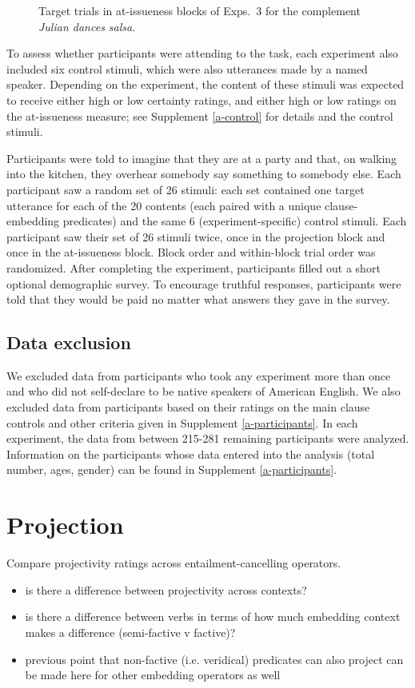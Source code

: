 \documentclass[11pt,fleqn]{article}
\newcommand{\6}{\mbox{$[\hspace*{-.6mm}[$}}
\newcommand{\9}{\mbox{$]\hspace*{-.6mm}]$}}
\begin{document}
\begin{figure}[h!]
\caption{Target trials in at-issueness blocks of Exps.~3 for the complement {\em Julian dances salsa}.}\label{fig:ai-exps3}
\end{figure}


To assess whether participants were attending to the task, each experiment also included six control stimuli, which were also utterances made by a named speaker. Depending on the experiment, the content of these stimuli was expected to receive either high or low certainty ratings, and either high or low ratings on the at-issueness measure; see Supplement \ref{a-control} for details and the control stimuli.

Participants were told to imagine that they are at a party and that, on walking into the kitchen, they overhear somebody say something to somebody else. Each participant saw a random set of 26 stimuli: each set contained one target utterance for each of the 20 contents (each paired with a unique clause-embedding predicates) and the same 6 (experiment-specific) control stimuli. Each participant saw their set of 26 stimuli twice, once in the projection block and once in the at-issueness block. Block order and within-block trial order was randomized. After completing the experiment, participants filled out a short optional demographic survey. To encourage truthful responses, participants were told that they would be paid no matter what answers they gave in the survey.

\subsection{Data exclusion} 

We excluded data from participants who took any experiment more than once and who did not self-declare to be native speakers of American English. We also excluded data from participants based on their ratings on the main clause controls and other criteria given in Supplement \ref{a-participants}. In each experiment, the data from between 215-281 remaining participants were analyzed. Information on the participants whose data entered into the analysis (total number, ages, gender) can be found in Supplement \ref{a-participants}.

\newpage

\section{Projection}

Compare projectivity ratings across entailment-cancelling operators. 
\begin{itemize}
  \item is there a difference between projectivity across contexts? 
  \item is there a difference between verbs in terms of how much embedding context makes a difference (semi-factive v factive)?
  \item previous point that non-factive (i.e. veridical) predicates can also project can be made here for other embedding operators as well
\end{itemize}
\end{document}

